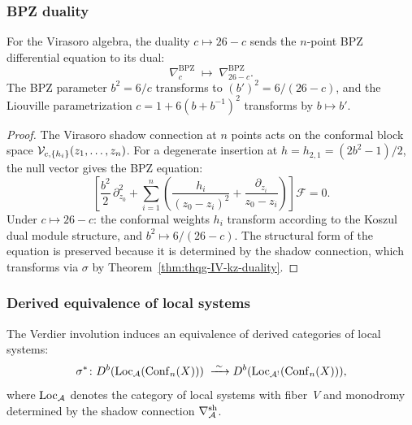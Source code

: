 \subsubsection{BPZ duality}

\begin{proposition}
\label{prop:thqg-IV-bpz-duality}
For the Virasoro algebra, the duality $c \mapsto 26 - c$ sends
the $n$-point BPZ differential equation to its dual:
\begin{equation}%
\nabla^{\mathrm{BPZ}}_c \;\longmapsto\; \nabla^{\mathrm{BPZ}}_{26-c}.
\end{equation}
The BPZ parameter $b^2 = 6/c$ transforms to
$(b')^2 = 6/(26-c)$, and the Liouville parametrization
$c = 1 + 6(b + b^{-1})^2$ transforms by $b \mapsto b'$.
\end{proposition}

\begin{proof}
The Virasoro shadow connection at $n$ points acts on the conformal
block space $\mathcal{V}_{c, \{h_i\}}(z_1, \ldots, z_n)$.
For a degenerate insertion at $h = h_{2,1} = (2b^2 - 1)/2$,
the null vector gives the BPZ equation:
\[
\left[
 \frac{b^2}{2}\,\partial_{z_0}^2
 + \sum_{i=1}^n \left(
 \frac{h_i}{(z_0 - z_i)^2}
 + \frac{\partial_{z_i}}{z_0 - z_i}
 \right)
\right]
\mathcal{F} = 0.
\]
Under $c \mapsto 26 - c$: the conformal weights $h_i$ transform
according to the Koszul dual module structure, and $b^2 \mapsto 6/(26-c)$.
The structural form of the equation is preserved because it is
determined by the shadow connection, which transforms via
$\sigma$ by Theorem~\ref{thm:thqg-IV-kz-duality}.
\end{proof}

\subsubsection{Derived equivalence of local systems}

\begin{theorem}
The Verdier involution induces an equivalence of derived categories
of local systems:
\begin{equation}%
\sigma^*\colon
D^b(\Loc_{\cA}(\Conf_n(X)))
\;\xrightarrow{\;\sim\;}
D^b(\Loc_{\cA^!}(\Conf_n(X))),
\end{equation}
where $\operatorname{Loc}_{\mathcal{A}}$ denotes the category of local systems with
fiber~$V$ and monodromy determined by the shadow connection
$\nabla^{\mathrm{sh}}_{\mathcal{A}}$.
\end{theorem}


